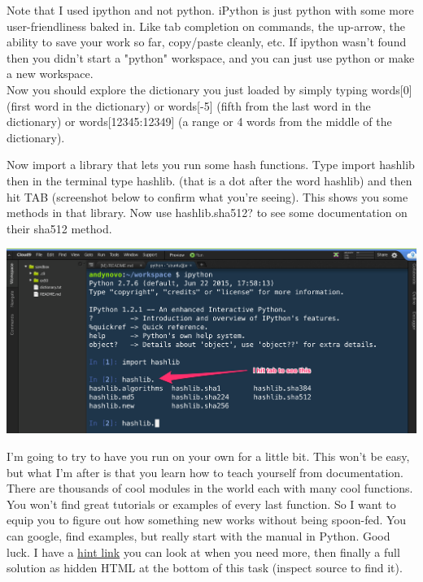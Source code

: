 \documentclass[12pt]{book}
\newenvironment{task}[1][Task:]{ %
    \medskip
    \begin{mdframed}[style=info]
        \noindent{\textbf{#1}}
}{
    \end{mdframed}
}
\begin{document}
Note that I used ipython and not python. iPython is just python with some more user-friendliness baked in. Like tab completion on commands, the up-arrow, the ability to save your work so far, copy/paste cleanly, etc. If ipython wasn't found then you didn't start a "python" workspace, and you can just use python or make a new workspace.\\

Now you should explore the dictionary you just loaded by simply typing words[0] (first word in the dictionary) or words[-5] (fifth from the last word in the dictionary) or words[12345:12349] (a range or 4 words from the middle of the dictionary).

\begin{task}[Hash Libraries in Python:]
  Now import a library that lets you run some hash functions. Type import hashlib then in the terminal type hashlib. (that is a dot after the word hashlib) and then hit TAB (screenshot below to confirm what you're seeing). This shows you some methods in that library. Now use hashlib.sha512? to see some documentation on their sha512 method.
\end{task}

\begin{center}
\includegraphics[width=\textwidth,height=\textheight,keepaspectratio]{ipython}
\end{center}

I'm going to try to have you run on your own for a little bit. This won't be easy, but what I'm after is that you learn how to teach yourself from documentation. There are thousands of cool modules in the world each with many cool functions. You won't find great tutorials or examples of every last function. So I want to equip you to figure out how something new works without being spoon-fed. You can google, find examples, but really start with the manual in Python. Good luck. I have a \href{https://crypto.prof.ninja/class1/kata4hint1.png}{hint link} you can look at when you need more, then finally a full solution as hidden HTML at the bottom of this task (inspect source to find it).
\end{document}
